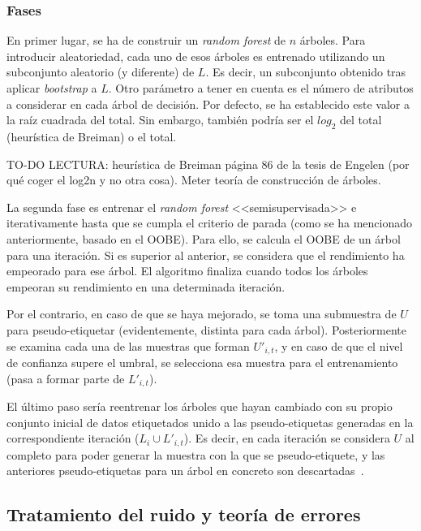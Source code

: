 \begin{itemize}
\subsubsection{Fases}

En primer lugar, se ha de construir un \textit{random forest} de $n$ árboles. Para introducir aleatoriedad, cada uno de esos árboles es entrenado utilizando un subconjunto aleatorio (y diferente) de $L$. Es decir, un subconjunto obtenido tras aplicar \textit{bootstrap} a $L$.
Otro parámetro a tener en cuenta es el número de atributos a considerar en cada árbol de decisión. Por defecto, se ha establecido este valor a la raíz cuadrada del total. Sin embargo, también podría ser el $log_{2}$ del total (heurística de Breiman) o el total.

TO-DO LECTURA: heurística de Breiman página 86 de la tesis de Engelen (por qué coger el log2n y no otra cosa). Meter teoría de construcción de árboles.

La segunda fase es entrenar el \textit{random forest} <<semisupervisada>> e iterativamente hasta que se cumpla el criterio de parada (como se ha mencionado anteriormente, basado en el OOBE). Para ello, se calcula el OOBE de un árbol para una iteración. Si es superior al anterior, se considera que el rendimiento ha empeorado para ese árbol. El algoritmo finaliza cuando todos los árboles empeoran su rendimiento en una determinada iteración.

Por el contrario, en caso de que se haya mejorado, se toma una submuestra de $U$ para pseudo-etiquetar (evidentemente, distinta para cada árbol). Posteriormente se examina cada una de las muestras que forman $U'_{i, t}$, y en caso de que el nivel de confianza supere el umbral, se selecciona esa muestra para el entrenamiento (pasa a formar parte de $L'_{i, t}$).

El último paso sería reentrenar los árboles que hayan cambiado con su propio conjunto inicial de datos etiquetados unido a las pseudo-etiquetas generadas en la correspondiente iteración ($L_{i}\cup L'_{i,t}$). Es decir, en cada iteración se considera $U$ al completo para poder generar la muestra con la que se pseudo-etiquete, y las anteriores pseudo-etiquetas para un árbol en concreto son descartadas~\cite{engelen2018thesis}.


\end{itemize} 

\subsection{Tratamiento del ruido y teoría de errores}


